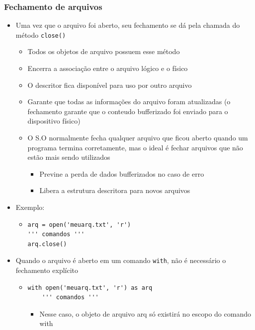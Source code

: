 \documentclass[12pt]{article}
\begin{document}
        \subsubsection{Fechamento de arquivos}
        \begin{itemize}
            \item Uma vez que o arquivo foi aberto, seu fechamento se dá pela 
            chamada do método \verb|close()|
            \begin{itemize}
                \item Todos os objetos de arquivo possuem esse método
                \item Encerra a associação entre o arquivo lógico e o físico
                \item O descritor fica disponível para uso por outro arquivo
                \item Garante que todas as informações do arquivo foram 
                atualizadas (o fechamento garante que o conteudo bufferizado 
                foi enviado para o dispositivo físico) 
                \item O S.O normalmente fecha qualquer arquivo que ficou aberto 
                quando um programa termina corretamente, mas o ideal é fechar 
                arquivos que não estão mais sendo utilizados
                \begin{itemize}
                    \item Previne a perda de dados bufferizados no caso de erro
                    \item Libera a estrutura descritora para novos arquivos
                \end{itemize}
            \end{itemize}
            \item Exemplo:
            \begin{itemize}
                \item \begin{verbatim}
arq = open('meuarq.txt', 'r')
''' comandos '''
arq.close()\end{verbatim}
            \end{itemize}
            \item Quando o arquivo é aberto em um comando \verb|with|, não é 
            necessário o fechamento explícito
            \begin{itemize}
                \item \begin{verbatim}
with open('meuarq.txt', 'r') as arq
    ''' comandos '''\end{verbatim}
                \begin{itemize}
                    \item Nesse caso, o objeto de arquivo arq só existirá no 
                    escopo do comando with
                \end{itemize}
            \end{itemize}
        \end{itemize}
\end{document}
